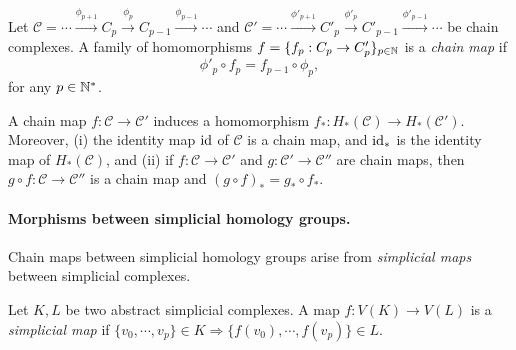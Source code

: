\begin{defin}
Let 
$\mathcal C = \cdots \overset{\phi_{p+1}}{\longrightarrow} C_p\overset{\phi_{p}}{\longrightarrow}C_{p-1}\overset{\phi_{p-1}}{\longrightarrow}\cdots$ 
and $\mathcal C'=\cdots \overset{\phi'_{p+1}}{\longrightarrow} C'_p\overset{\phi'_{p}}{\longrightarrow}C'_{p-1}\overset{\phi'_{p-1}}{\longrightarrow}\cdots$
be chain complexes. A family of homomorphisms $f=\{f_p:C_p\rightarrow C'_p\}_{p\in\mathbb{N}}$ is a {\em chain map} if 
$$\phi'_p\circ f_p=f_{p-1}\circ \phi_p,$$
for any $p\in\mathbb{N}^*$. 
\end{defin}

\begin{prop}
A chain map $f:\mathcal C\rightarrow \mathcal C'$ induces a homomorphism $f_*:H_*(\mathcal C)\rightarrow H_*(\mathcal C')$.
Moreover, {\rm (i)} the identity map ${\rm id}$ of $\mathcal C$ is a chain map, and ${\rm id}_*$ is the identity map of $H_*(\mathcal C)$,
and {\rm (ii)} if $f:\mathcal C\rightarrow \mathcal C'$ and $g:\mathcal C'\rightarrow \mathcal C''$ are chain maps, then 
$g\circ f:\mathcal C\rightarrow \mathcal C''$ is a chain map and $(g\circ f)_*=g_*\circ f_*$. 
\end{prop}


\paragraph*{Morphisms between simplicial homology groups.} Chain maps between simplicial homology groups arise from {\em simplicial maps}
between simplicial complexes.

\begin{defin}
Let $K,L$ be two abstract simplicial complexes.
A map $f:V(K)\rightarrow V(L)$ is a {\em simplicial map} if
$\{v_0,\cdots,v_p\}\in K\Rightarrow \{f(v_0),\cdots,f(v_p)\}\in L$.
\end{defin}

